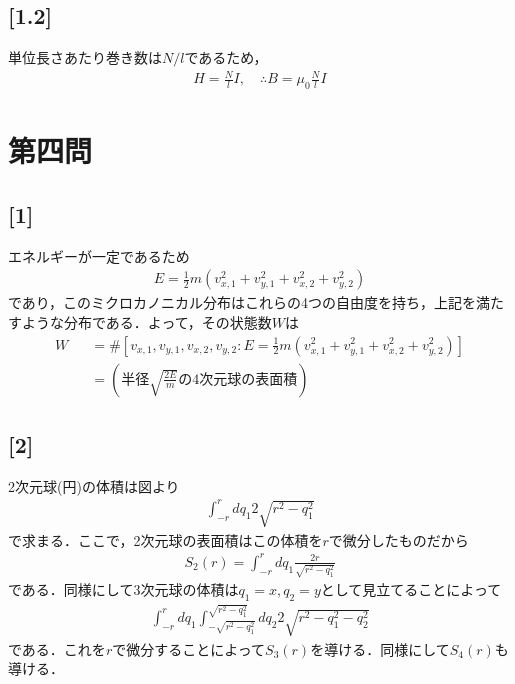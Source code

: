 \documentclass[12pt,dvipdfmx]{jsarticle}
\begin{document}
\subsection*{\large{[1.2]}}
単位長さあたり巻き数は$N/l$であるため，
\begin{eqnarray}
  H = \frac{N}{l}I,\quad\therefore B= \mu_0 \frac{N}{l}I
\end{eqnarray}

\newpage
\section*{\Large{第四問}}
\subsection*{\large{[1]}}
エネルギーが一定であるため
\begin{eqnarray}
  E = \frac{1}{2}m\left( v_{x,1}^2 + v_{y,1}^2 + v_{x,2}^2 + v_{y,2}^2 \right)
\end{eqnarray}
であり，このミクロカノニカル分布はこれらの4つの自由度を持ち，上記を満たすような分布である．よって，その状態数$W$は
\begin{eqnarray}
  W &&= \# \left[ v_{x,1},v_{y,1},v_{x,2},v_{y,2} : E = \frac{1}{2}m\left( v_{x,1}^2 + v_{y,1}^2 + v_{x,2}^2 + v_{y,2}^2 \right) \right]\\
  &&=\left( 半径 \sqrt{\frac{2E}{m}}の4次元球の表面積 \right)
\end{eqnarray}

\subsection*{\large{[2]}}
2次元球(円)の体積は図より
\begin{eqnarray}
  \int_{-r}^{r} dq_1 2\sqrt{r^2-q_1^2}
\end{eqnarray}
で求まる．ここで，2次元球の表面積はこの体積を$r$で微分したものだから
\begin{eqnarray}
  S_2(r) = \int_{-r}^{r} dq_1 \frac{2r}{\sqrt{r^2-q_1^2}}
\end{eqnarray}
である．同様にして3次元球の体積は$q_1=x,q_2=y$として見立てることによって
\begin{eqnarray}
  \int_{-r}^{r}dq_1 \int_{-\sqrt{r^2-q_1^2}}^{\sqrt{r^2-q_1^2}}dq_2 2\sqrt{r^2-q_1^2-q_2^2}
\end{eqnarray}
である．これを$r$で微分することによって$S_3(r)$を導ける．同様にして$S_4(r)$も導ける．
\end{document}

